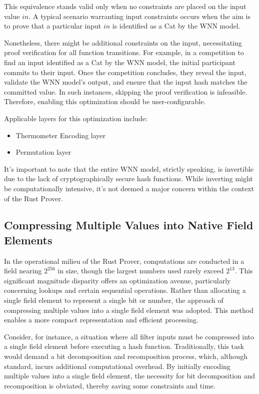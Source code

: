 \documentclass{article}[12pt]
\begin{document}
This equivalence stands valid only when no constraints are placed on the input value \( in \).
A typical scenario warranting input constraints occurs when the aim is to prove that a particular input \( in \) is identified as a Cat by the WNN model.

Nonetheless, there might be additional constraints on the input, necessitating proof verification for all function transitions.
For example, in a competition to find an input identified as a Cat by the WNN model, the initial participant commits to their input.
Once the competition concludes, they reveal the input, validate the WNN model's output, and ensure that the input hash matches the committed value.
In such instances, skipping the proof verification is infeasible.
Therefore, enabling this optimization should be user-configurable.

Applicable layers for this optimization include:
\begin{itemize}
    \item Thermometer Encoding layer
    \item Permutation layer
\end{itemize}

It's important to note that the entire WNN model, strictly speaking, is invertible due to the lack of cryptographically secure hash functions.
While inverting might be computationally intensive, it's not deemed a major concern within the context of the Rust Prover.

\subsection{Compressing Multiple Values into Native Field Elements}\label{subsec:encoding-values}

In the operational milieu of the Rust Prover, computations are conducted in a field nearing \(2^{256}\) in size, though the largest numbers used rarely exceed \(2^{13}\).
This significant magnitude disparity offers an optimization avenue, particularly concerning lookups and certain sequential operations.
Rather than allocating a single field element to represent a single bit or number, the approach of compressing multiple values into a single field element was adopted.
This method enables a more compact representation and efficient processing.

Consider, for instance, a situation where all filter inputs must be compressed into a single field element before executing a hash function.
Traditionally, this task would demand a bit decomposition and recomposition process, which, although standard, incurs additional computational overhead.
By initially encoding multiple values into a single field element, the necessity for bit decomposition and recomposition is obviated, thereby saving some constraints and time.
\end{document}
